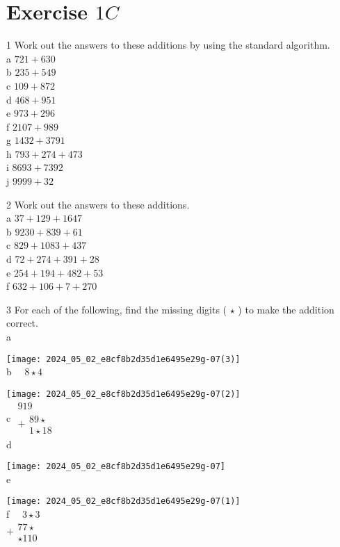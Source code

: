 \documentclass[10pt]{article}
\begin{document}
\section*{Exercise \(1 C\)}
1 Work out the answers to these additions by using the standard algorithm.\\
a \(721+630\)\\
b \(235+549\)\\
c \(109+872\)\\
d \(468+951\)\\
e \(973+296\)\\
f \(2107+989\)\\
g \(1432+3791\)\\
h \(793+274+473\)\\
i \(8693+7392\)\\
j \(9999+32\)

2 Work out the answers to these additions.\\
a \(37+129+1647\)\\
b \(9230+839+61\)\\
c \(829+1083+437\)\\
d \(72+274+391+28\)\\
e \(254+194+482+53\)\\
f \(632+106+7+270\)

3 For each of the following, find the missing digits ( \(\star\) ) to make the addition correct.\\
a

\texttt{[image: 2024\_05\_02\_e8cf8b2d35d1e6495e29g-07(3)]}\\
b \(\quad 8 \star 4\)

\texttt{[image: 2024\_05\_02\_e8cf8b2d35d1e6495e29g-07(2)]}\\
c \(\begin{array}{r}919 \\ +\begin{array}{r}89 \star \\ \hline 1 \star 18\end{array}\end{array}\)\\
d

\texttt{[image: 2024\_05\_02\_e8cf8b2d35d1e6495e29g-07]}\\
e

\texttt{[image: 2024\_05\_02\_e8cf8b2d35d1e6495e29g-07(1)]}\\
f \(\quad 3 \star 3\)\\
\(+\begin{array}{r}77 \star \\ \star 110\end{array}\)
\end{document}
